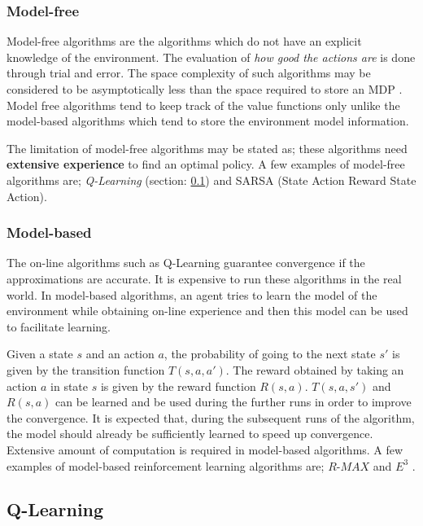 \documentclass[12pt]{report}
\begin{document}
\subsubsection{Model-free}
Model-free algorithms are the algorithms which do not have an explicit knowledge of the environment. The evaluation of \textit{how good the actions are} is done through trial and error. The space complexity of such algorithms may be considered to be asymptotically less than the space required to store an MDP \cite{strehl2006pac}. Model free algorithms tend to keep track of the value functions only unlike the model-based algorithms which tend to store the environment model information.\par The limitation of model-free algorithms may be stated as; these algorithms need \textbf{extensive experience} to find an optimal policy. A few examples of model-free algorithms are; \textit{Q-Learning} (section: \ref{q_learning}) and SARSA (State Action Reward State Action).

\subsubsection{Model-based}
The on-line algorithms such as Q-Learning guarantee convergence if the approximations are accurate. It is expensive to run these algorithms in the real world. In model-based algorithms, an agent tries to learn the model of the environment while obtaining on-line experience and then this model can be used to facilitate learning. \par 
Given a state $s$ and an action $a$, the probability of going to the next state $s'$ is given by the transition function $T(s,a,a')$. The reward obtained by taking an action $a$ in state $s$ is given by the reward function $R(s,a)$. $T(s,a,s')$ and $R(s,a)$ can be learned and be used during the further runs in order to improve the convergence. It is expected that, during the subsequent runs of the algorithm, the model should already be sufficiently learned to speed up convergence. Extensive amount of computation is required in model-based algorithms. A few examples of model-based reinforcement learning algorithms are;  $R$-$MAX$ \cite{brafman2002r} and $E^3$ \cite{kearns2002near}.

\subsection{Q-Learning}
\label{q_learning}
\end{document}
